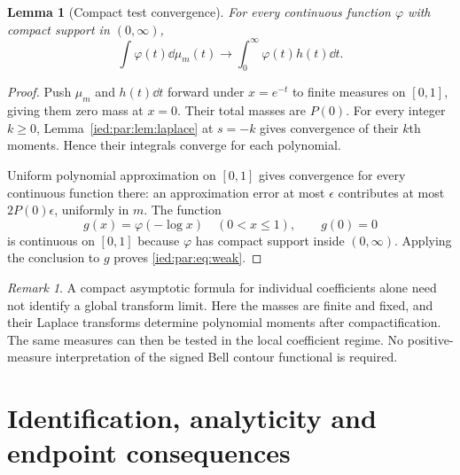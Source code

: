 \documentclass[11pt,letterpaper]{article}
\newtheorem{lemma}[theorem]{Lemma}
\theoremstyle{remark}\newtheorem{remark}[theorem]{Remark}
\begin{document}
\begin{lemma}[Compact test convergence]\label{ied:par:lem:weak}
For every continuous function $\varphi$ with compact support in
$(0,\infty)$,
\begin{equation}\label{ied:par:eq:weak}
 \int\varphi(t)\dd\mu_m(t)\longrightarrow
 \int_0^\infty\varphi(t)h(t)\dd t.
\end{equation}
\end{lemma}
\begin{proof}
Push $\mu_m$ and $h(t)\dd t$ forward under $x=e^{-t}$ to finite
measures on $[0,1]$, giving them zero mass at $x=0$.
Their total masses are $P(0)$. For every integer $k\ge0$,
Lemma~\ref{ied:par:lem:laplace} at $s=-k$ gives convergence of their $k$th
moments. Hence their integrals converge for each polynomial.

Uniform polynomial approximation on $[0,1]$ gives convergence for
every continuous function there: an approximation error at most
$\epsilon$ contributes at most $2P(0)\epsilon$, uniformly in $m$.
The function
\[
 g(x)=\varphi(-\log x)\quad(0<x\le1),\qquad g(0)=0
\]
is continuous on $[0,1]$ because $\varphi$ has compact support inside
$(0,\infty)$. Applying the conclusion to $g$ proves \eqref{ied:par:eq:weak}.
\end{proof}

\begin{remark}
A compact asymptotic formula for individual coefficients alone need not
identify a global transform limit. Here the masses are finite and
fixed, and their Laplace transforms determine polynomial moments after
compactification. The same measures can then be tested in the local
coefficient regime. No positive-measure interpretation of the signed
Bell contour functional is required.
\end{remark}

\section{Identification, analyticity and endpoint consequences}\label{ied:par:sec:identification}
\end{document}
